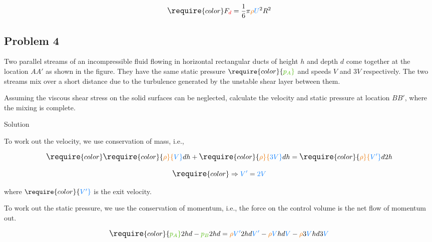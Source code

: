 \documentclass[
  1.2em,
  letterpaper,
  DIV=11,
  numbers=noendperiod]{scrartcl}
\begin{document}
\[
\large
\require{color}F_{{\color[rgb]{0.986252,0.007236,0.027423}d}} = \frac{1}{6}\pi {\color[rgb]{0.918231,0.469102,0.038229}\rho  {\color[rgb]{0.059472,0.501943,0.998465}U}}^2 R^2
\]

\hypertarget{problem-4}{%
\subsection{Problem 4}\label{problem-4}}

Two parallel streams of an incompressible fluid flowing in horizontal
rectangular ducts of height \(h\) and depth \(d\) come together at the
location \(AA'\) as shown in the figure. They have the same static
pressure
\(\require{color}{\color[rgb]{0.315209,0.728565,0.037706}p_{A}}\) and
speeds \(V\) and \(3V\) respectively. The two streams mix over a short
distance due to the turbulence generated by the unstable shear layer
between them.

Assuming the viscous shear stress on the solid surfaces can be
neglected, calculate the velocity and static pressure at location
\(BB'\), where the mixing is complete.

Solution

To work out the velocity, we use conservation of mass, i.e.,

\[
\large
\require{color} \require{color}{\color[rgb]{0.918231,0.469102,0.038229}\rho} {\color[rgb]{0.059472,0.501943,0.998465}V } dh + \require{color}{\color[rgb]{0.918231,0.469102,0.038229}\rho}{\color[rgb]{0.059472,0.501943,0.998465}3V } dh = \require{color}{\color[rgb]{0.918231,0.469102,0.038229}\rho} {\color[rgb]{0.059472,0.501943,0.998465}V'} d 2h
\]

\[
\large
\require{color} \Rightarrow {\color[rgb]{0.059472,0.501943,0.998465}V'} = {\color[rgb]{0.059472,0.501943,0.998465}2V}
\]

where \(\require{color}{\color[rgb]{0.059472,0.501943,0.998465}V'}\) is
the exit velocity.

To work out the static pressure, we use the conservation of momentum,
i.e., the force on the control volume is the net flow of momentum out.

\[
\large
\require{color}{\color[rgb]{0.315209,0.728565,0.037706}p_{A}} 2hd - {\color[rgb]{0.315209,0.728565,0.037706}p_{B}}2hd = {\color[rgb]{0.918231,0.469102,0.038229}\rho}{\color[rgb]{0.059472,0.501943,0.998465}V'} 2hd{\color[rgb]{0.059472,0.501943,0.998465}V'} - {\color[rgb]{0.918231,0.469102,0.038229}\rho} {\color[rgb]{0.059472,0.501943,0.998465}V} hd{\color[rgb]{0.059472,0.501943,0.998465}V} - {\color[rgb]{0.918231,0.469102,0.038229}\rho} 3{\color[rgb]{0.059472,0.501943,0.998465}V} hd3{\color[rgb]{0.059472,0.501943,0.998465}V}
\]
\end{document}
